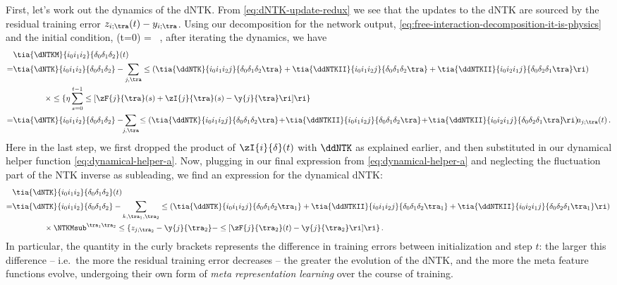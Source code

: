 First, let's work out the dynamics of the dNTK. From \eqref{eq:dNTK-update-redux} we see that the updates to the dNTK are sourced by the residual training error $z_{i;\tra}(t)-y_{i;\tra}$. Using our decomposition for the network output, \eqref{eq:free-interaction-decomposition-it-is-physics} and the initial condition,
\be
{}(t=0) = \, ,
\ee
after iterating the dynamics, we have
\begin{align}\label{eq:dNTK-time-dependent-solution-semiformal}
&\tia{\dNTKM}{i_0i_1i_2}{\delta_0\delta_1\delta_2}(t) \,  \\
=&\tia{\dNTK}{i_0i_1i_2}{\delta_0\delta_1\delta_2}-\sum_{j,\tra}\le(\tia{\ddNTK}{i_0i_1 i_2j}{\delta_0\delta_1\delta_2\tra}+\tia{\ddNTKII}{i_0i_1 i_2j}{\delta_0\delta_1\delta_2\tra}+\tia{\ddNTKII}{i_0i_2 i_1j}{\delta_0\delta_2\delta_1\tra}\ri) \, \notag \\
&\qquad\qquad\times \le\{\eta\sum_{s=0}^{t-1}\le[\zF{j}{\tra}(s)+\zI{j}{\tra}(s)-\y{j}{\tra}\ri]\ri\} \, \notag \\
=&\tia{\dNTK}{i_0i_1i_2}{\delta_0\delta_1\delta_2}-\!\!\sum_{j,\tra}\!\le(\tia{\ddNTK}{i_0i_1 i_2j}{\delta_0\delta_1\delta_2\tra}\!+\!\tia{\ddNTKII}{i_0i_1 i_2j}{\delta_0\delta_1\delta_2\tra}\!+\!\tia{\ddNTKII}{i_0i_2 i_1j}{\delta_0\delta_2\delta_1\tra}\!\ri)\! a_{j;\tra}(t)\, . \notag
\end{align}
Here in the last step, we first dropped the product of $\zI{i}{\delta}(t)$ with $\ddNTK$ as explained earlier, and then substituted in our dynamical helper function \eqref{eq:dynamical-helper-a}.
Now, plugging in our final expression
from \eqref{eq:dynamical-helper-a} and neglecting the fluctuation part of the NTK inverse as subleading, we find an expression for the %
dynamical dNTK:
\begin{align}\label{eq:dNTK-time-dependent-solution}
&\tia{\dNTK}{i_0i_1i_2}{\delta_0\delta_1\delta_2}(t) \, \notag \\
=&\tia{\dNTK}{i_0i_1i_2}{\delta_0\delta_1\delta_2}-\sum_{k,\tra_1,\tra_2}\le(\tia{\ddNTK}{i_0i_1 i_2j}{\delta_0\delta_1\delta_2\tra_1}+\tia{\ddNTKII}{i_0i_1 i_2j}{\delta_0\delta_1\delta_2\tra_1}+\tia{\ddNTKII}{i_0i_2 i_1j}{\delta_0\delta_2\delta_1\tra_1}\ri) \, \notag \\
&\qquad\qquad\times\NTKMsub^{\tra_1\tra_2}\le\{z_{j;\tra_2}-\y{j}{\tra_2}-\le[\zF{j}{\tra_2}(t)-\y{j}{\tra_2}\ri]\ri\}\,  . %
\end{align}
In particular, the quantity in the curly brackets represents the difference in training errors between initialization and step $t$: the larger this difference -- i.e.~the more the residual training error decreases -- the greater the evolution of the dNTK, and the more the meta feature functions evolve, undergoing their own form of \emph{meta representation learning} %
over the course of training. %












